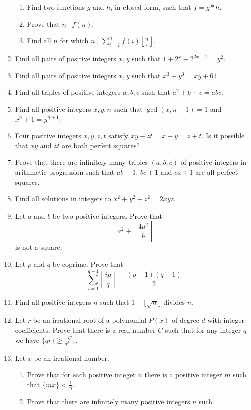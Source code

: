 \documentclass{article}
\begin{document}
\begin{enumerate}
      \begin{enumerate}
        \item Find two functions $g$ and $h$, in closed form, such that $f=g*h$.
        \item 
          Prove that $n\mid f(n)$.
        \item Find all $n$ for which $n\mid\displaystyle\sum_{i=1}^n f(i)\left\lfloor\frac
              ni\right\rfloor$.
      \end{enumerate}
  \item Find all pairs of positive integers $x,y$ such that
    $1+2^x+2^{2x+1}=y^2$.
  \item Find all pairs of positive integers $x,y$ such that $x^3-y^3=xy+61$.
  \item Find all triples of positive integers $a,b,c$ such that $a^2+b+c=abc$.
  \item Find all positive integers $x,y,n$ such that $\gcd(x,n+1)=1$ and
    $x^n+1=y^{n+1}$.
  \item Four positive integers $x,y,z,t$ satisfy $xy-zt=x+y=z+t$. Is it possible
    that $xy$ and $zt$ are both perfect squares?
  \item Prove that there are infinitely many triples $(a,b,c)$ of positive
    integers in arithmetic progression
    such that $ab+1$, $bc+1$ and $ca+1$ are all perfect squares.
  \item Find all solutions in integers to $x^2+y^2+z^2=2xyz$.
  \item Let $a$ and $b$ be two positive integers. Prove that
    \[a^2+\left\lceil\frac{4a^2}b\right\rceil\] is not a square.
  \item Let $p$ and $q$ be coprime. Prove that
    \[\sum_{i=1}^{q-1}\left\lfloor\frac{ip}{q}\right\rfloor=\frac{(p-1)(q-1)}2.\]
  \item Find all positive integers $n$ such that $1+\lfloor\sqrt n\rfloor$
    divides $n$.
  \item Let $r$ be an irrational root of a polynomial $P(x)$ of degree $d$ with
    integer coefficients. Prove that there is a real number $C$ such that for
    any integer $q$ we have $\{qr\}\ge \frac C{q^{d-1}}$.
  \item Let $x$ be an irrational number.
    \begin{enumerate}
      \item Prove that for each positive integer $n$ there is a positive integer
        $m$ such that $\{mx\}<\frac 1n$.
      \item Prove that there are infinitely many positive integers $n$ such

\end{enumerate}
\end{enumerate}
\end{document}
